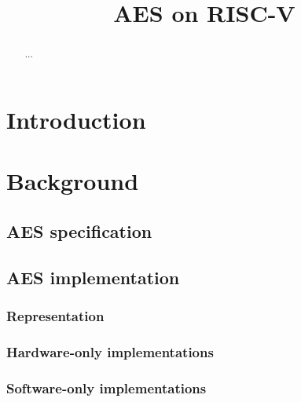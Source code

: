\documentclass[submission]{iacrtrans}
\title{AES on RISC-V}
\author{}
\institute{}
\author{}
\institute{}
\begin{document}

\maketitle

\begin{abstract}
...
\end{abstract}


\section{Introduction}
\label{sec:intro}



\section{Background}
\label{sec:bg}


\subsection{AES  specification}
\label{sec:bg:aes_spec}



\subsection{AES implementation}
\label{sec:bg:aes_impl}

\subsubsection{Representation}
\label{sec:bg:aes_impl_rep}


\subsubsection{Hardware-only implementations}
\label{sec:bg:aes_impl_hw}

\subsubsection{Software-only implementations}
\label{sec:bg:aes_impl_sw}

\end{document}
